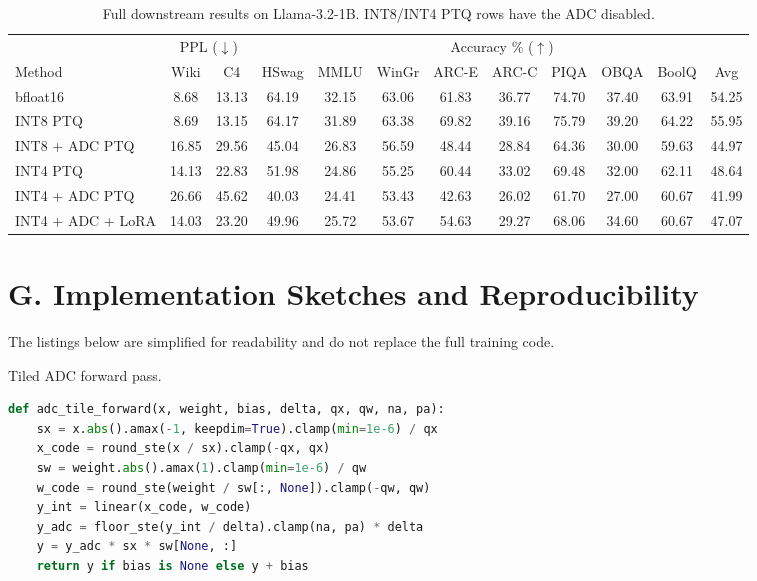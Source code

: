 \documentclass[letterpaper]{article} %
\theoremstyle{plain}
\begin{document}
\begin{table}[t]
\centering
\setlength{\tabcolsep}{5pt}
\begin{tabular}{l|cc|ccccccccc}
\toprule
 & \multicolumn{2}{c|}{PPL ($\downarrow$)} & \multicolumn{9}{c}{Accuracy \% ($\uparrow$)} \\
Method & Wiki & C4 & HSwag & MMLU & WinGr & ARC-E & ARC-C & PIQA & OBQA & BoolQ & Avg \\
\midrule
bfloat16          & 8.68  & 13.13 & 64.19 & 32.15 & 63.06 & 61.83 & 36.77 & 74.70 & 37.40 & 63.91 & 54.25 \\
INT8 PTQ          & 8.69  & 13.15 & 64.17 & 31.89 & 63.38 & 69.82 & 39.16 & 75.79 & 39.20 & 64.22 & 55.95 \\
INT8 + ADC PTQ    & 16.85 & 29.56 & 45.04 & 26.83 & 56.59 & 48.44 & 28.84 & 64.36 & 30.00 & 59.63 & 44.97 \\
INT4 PTQ          & 14.13 & 22.83 & 51.98 & 24.86 & 55.25 & 60.44 & 33.02 & 69.48 & 32.00 & 62.11 & 48.64 \\
INT4 + ADC PTQ    & 26.66 & 45.62 & 40.03 & 24.41 & 53.43 & 42.63 & 26.02 & 61.70 & 27.00 & 60.67 & 41.99 \\
INT4 + ADC + LoRA & 14.03 & 23.20 & 49.96 & 25.72 & 53.67 & 54.63 & 29.27 & 68.06 & 34.60 & 60.67 & 47.07 \\
\bottomrule
\end{tabular}
\caption{Full downstream results on Llama-3.2-1B. INT8/INT4 PTQ rows have the ADC disabled.}
\label{tab:downstream}
\end{table}

\section{G. Implementation Sketches and Reproducibility}

The listings below are simplified for readability and do not replace the full training code.

\begin{listing}[tb]
\caption{Tiled ADC forward pass.}
\label{lst:adc_forward}
\begin{lstlisting}[language=Python]
def adc_tile_forward(x, weight, bias, delta, qx, qw, na, pa):
    sx = x.abs().amax(-1, keepdim=True).clamp(min=1e-6) / qx
    x_code = round_ste(x / sx).clamp(-qx, qx)
    sw = weight.abs().amax(1).clamp(min=1e-6) / qw
    w_code = round_ste(weight / sw[:, None]).clamp(-qw, qw)
    y_int = linear(x_code, w_code)
    y_adc = floor_ste(y_int / delta).clamp(na, pa) * delta
    y = y_adc * sx * sw[None, :]
    return y if bias is None else y + bias
\end{lstlisting}
\end{listing}
\end{document}
